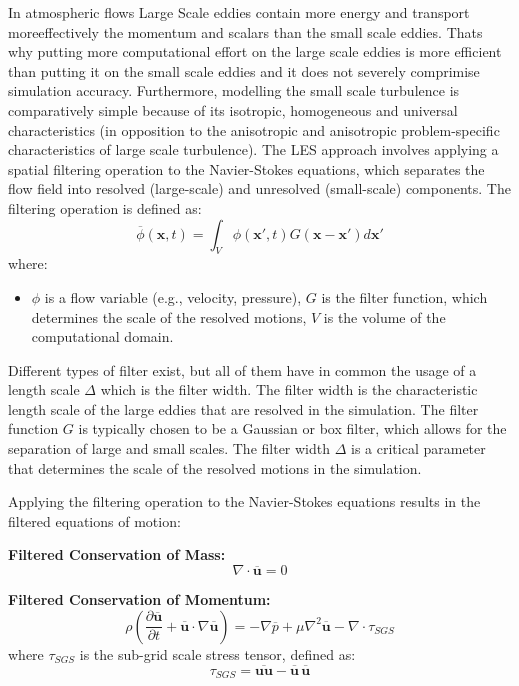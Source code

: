 In atmospheric flows Large Scale eddies contain more energy and transport moreeffectively the 
momentum and scalars than the small scale eddies\cite{spalart2000}. Thats why putting
more computational effort on the large scale eddies is more efficient than putting it on the small scale eddies and it 
does not severely comprimise simulation accuracy. Furthermore, modelling the small scale turbulence is comparatively simple because of
its isotropic, homogeneous and universal characteristics (in opposition to the anisotropic and
anisotropic problem-specific characteristics of large scale turbulence).
The LES approach involves applying a spatial filtering operation to the Navier-Stokes equations,
which separates the flow field into resolved (large-scale) and unresolved (small-scale) components.
The filtering operation is defined as: 
\begin{equation}
\overline{\phi}(\mathbf{x}, t) = \int_V \phi(\mathbf{x}', t) G(\mathbf{x} - \mathbf{x}') d\mathbf{x}'
\end{equation}
where:
\begin{itemize}
    \item $\phi$ is a flow variable (e.g., velocity, pressure), $G$ is the filter function, which determines the scale of the resolved motions, $V$ is the volume of the computational domain.
\end{itemize}

Different types of filter exist, but all of them have in common the
usage of a length scale $\Delta$ which is the filter width. The filter width
is the characteristic length scale of the large eddies that are resolved in the simulation.
The filter function $G$ is typically chosen to be a Gaussian or box filter,
which allows for the separation of large and small scales. The filter width $\Delta$ is a critical parameter that determines the scale of the resolved motions in the simulation.

Applying the filtering operation to the Navier-Stokes equations results in the filtered equations of motion:

\textbf{Filtered Conservation of Mass:}
\begin{equation}
\nabla \cdot \overline{\mathbf{u}} = 0
\end{equation}

\textbf{Filtered Conservation of Momentum:}
\begin{equation}
\rho \left( \frac{\partial \overline{\mathbf{u}}}{\partial t} + \overline{\mathbf{u}} \cdot \nabla \overline{\mathbf{u}} \right) = -\nabla \overline{p} + \mu \nabla^2 \overline{\mathbf{u}} - \nabla \cdot \tau_{SGS}
\end{equation}
where $\tau_{SGS}$ is the sub-grid scale stress tensor, defined as:
\begin{subequations}
    \begin{equation}
    \tau_{SGS} = \overline{\mathbf{u} \mathbf{u}} - \overline{\mathbf{u}} \, \overline{\mathbf{u}}
    \end{equation}
\end{subequations}
    

